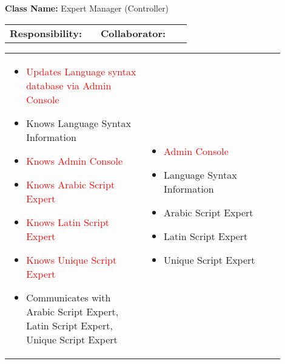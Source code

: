 \begin{cards}[]
    \textbf{Class Name:} Expert Manager (Controller)
    \tcbline
    \begin{tabular}{p{0.45\linewidth} | p{0.45\linewidth}}
        \textbf{Responsibility:}& 
        \textbf{Collaborator:}\\
    \end{tabular}
    \tcbline
    \begin{tabular}{p{0.45\linewidth} | p{0.45\linewidth}}
        \begin{itemize}
            \item \textcolor{red}{Updates Language syntax database via Admin Console}
            \item Knows Language Syntax Information
            \item \textcolor{red}{Knows Admin Console}
            \item \textcolor{red}{Knows Arabic Script Expert}
            \item \textcolor{red}{Knows Latin Script Expert}
            \item \textcolor{red}{Knows Unique Script Expert}
            \item Communicates with Arabic Script Expert, Latin Script Expert, Unique Script Expert
            
        \end{itemize}
        &
        \begin{itemize}
            \item \textcolor{red}{Admin Console}
            \item Language Syntax Information
            \item Arabic Script Expert
            \item Latin Script Expert
            \item Unique Script Expert
            
        \end{itemize}
    \end{tabular}
\end{cards}